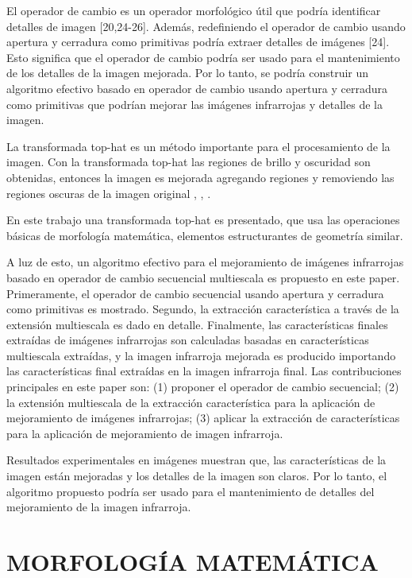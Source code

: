 \documentclass[a4paper, 11 pt, conference]{ieeeconf}      %
\begin{document}
El operador de cambio es un operador morfol\'ogico \'util que podr\'ia identificar detalles de imagen [20,24-26]. Adem\'as, redefiniendo el operador de cambio usando apertura y cerradura como primitivas podr\'ia extraer detalles de im\'agenes [24]. Esto significa que el operador de cambio podr\'ia ser usado para el mantenimiento de los detalles de la imagen mejorada. Por lo tanto, se podr\'ia construir un algoritmo efectivo basado en operador de cambio usando apertura y cerradura como primitivas que podr\'ian mejorar las im\'agenes infrarrojas y detalles de la imagen. 

La transformada top-hat es un m\'etodo importante para el procesamiento de la imagen. Con la transformada top-hat las regiones de brillo y oscuridad son obtenidas, entonces la imagen es mejorada agregando regiones y removiendo las regiones oscuras de la imagen original \cite{12}, \cite{14}, \cite{15}.

En este trabajo una transformada top-hat es presentado, que usa las operaciones b\'asicas de morfolog\'ia matem\'atica, elementos estructurantes de geometr\'ia similar.

A luz de esto, un algoritmo efectivo para el mejoramiento de im\'agenes infrarrojas basado en operador de cambio secuencial multiescala es propuesto en este paper. Primeramente, el operador de cambio secuencial usando apertura y cerradura como primitivas es mostrado. Segundo, la extracci\'on caracter\'istica a trav\'es de la extensi\'on multiescala es dado en detalle. Finalmente, las caracter\'isticas finales extra\'idas de im\'agenes infrarrojas son calculadas basadas en caracter\'isticas multiescala extra\'idas, y la imagen infrarroja mejorada es producido importando las caracter\'isticas final extra\'idas en la imagen infrarroja final. Las contribuciones principales en este paper son: (1) proponer el operador de cambio secuencial; (2) la extensi\'on multiescala de la extracci\'on caracter\'istica para la aplicaci\'on de mejoramiento de im\'agenes infrarrojas; (3) aplicar la extracci\'on de caracter\'isticas para la aplicaci\'on de mejoramiento de imagen infrarroja.

Resultados experimentales en im\'agenes muestran que, las caracter\'isticas de la imagen est\'an mejoradas y los detalles de la imagen son claros. Por lo tanto, el algoritmo propuesto podr\'ia ser usado para el mantenimiento de detalles del mejoramiento de la imagen infrarroja.
\\
\section{MORFOLOG\'IA MATEM\'ATICA}
\\
\end{document}
